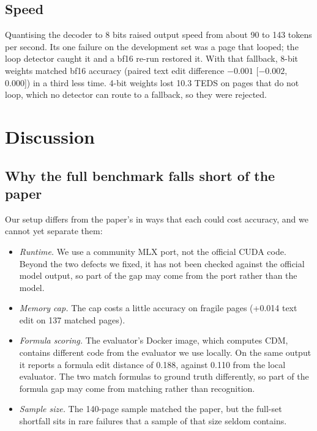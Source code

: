 \documentclass[journal]{IEEEtran}
\begin{document}
\subsection{Speed}

Quantising the decoder to 8 bits raised output speed from about 90 to 143
tokens per second. Its one failure on the development set was a page that
looped; the loop detector caught it and a bf16 re-run restored it. With that
fallback, 8-bit weights matched bf16 accuracy (paired text edit difference
$-0.001$ [$-0.002$, 0.000]) in a third less time. 4-bit weights lost
10.3 TEDS on pages that do not loop, which no detector can route to a fallback,
so they were rejected.

\section{Discussion}

\subsection{Why the full benchmark falls short of the paper}

Our setup differs from the paper's in ways that each could cost accuracy, and
we cannot yet separate them:

\begin{itemize}
\item \emph{Runtime.} We use a community MLX port, not the official CUDA code.
Beyond the two defects we fixed, it has not been checked against the official
model output, so part of the gap may come from the port rather than the model.
\item \emph{Memory cap.} The cap costs a little accuracy on fragile pages
(+0.014 text edit on 137 matched pages).
\item \emph{Formula scoring.} The evaluator's Docker image, which computes CDM,
contains different code from the evaluator we use locally. On the same output it
reports a formula edit distance of 0.188, against 0.110 from the local evaluator.
The two match formulas to ground truth differently, so part of the formula gap
may come from matching rather than recognition.
\item \emph{Sample size.} The 140-page sample matched the paper, but the
full-set shortfall sits in rare failures that a sample of that size seldom
contains.
\end{itemize}
\end{document}
